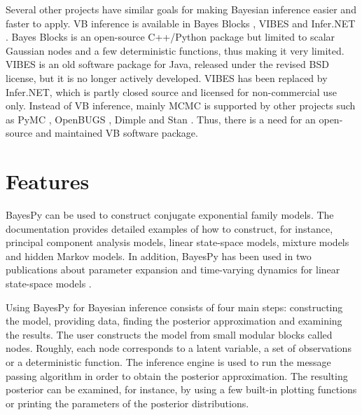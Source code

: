\documentclass[twoside,11pt]{article}
\begin{document}
Several other projects have similar goals for making Bayesian inference easier
and faster to apply.  VB inference is available in Bayes Blocks
\citep{Raiko:2007}, VIBES \citep{Bishop:2002} and Infer.NET \citep{Infer.NET}.
Bayes Blocks is an open-source C++/Python package but limited to scalar Gaussian
nodes and a few deterministic functions, thus making it very limited.  VIBES is
an old software package for Java, released under the revised BSD license, but it
is no longer actively developed.  VIBES has been replaced by Infer.NET, which
is partly closed source and licensed for non-commercial use only.  Instead of VB
inference, mainly MCMC is supported by other projects such as PyMC \citep{PyMC},
OpenBUGS \citep{OpenBUGS}, Dimple \citep{Dimple} and Stan \citep{Stan}.  Thus,
there is a need for an open-source and maintained VB software package.



\section{Features}


BayesPy can be used to construct conjugate exponential family models.  The
documentation provides detailed examples of how to construct, for instance,
principal component analysis models, linear state-space models, mixture models
and hidden Markov models.  In addition, BayesPy has been used in two
publications about parameter expansion and time-varying dynamics for linear
state-space models \citep{Luttinen:2013,Luttinen:2014}.



Using BayesPy for Bayesian inference consists of four main steps: constructing
the model, providing data, finding the posterior approximation and examining the
results.  The user constructs the model from small modular blocks called nodes.
Roughly, each node corresponds to a latent variable, a set of observations or a
deterministic function.
The inference engine is used to run the message passing algorithm in order to
obtain the posterior approximation.  The resulting posterior can be examined,
for instance, by using a few built-in plotting functions or printing the
parameters of the posterior distributions.
\end{document}
